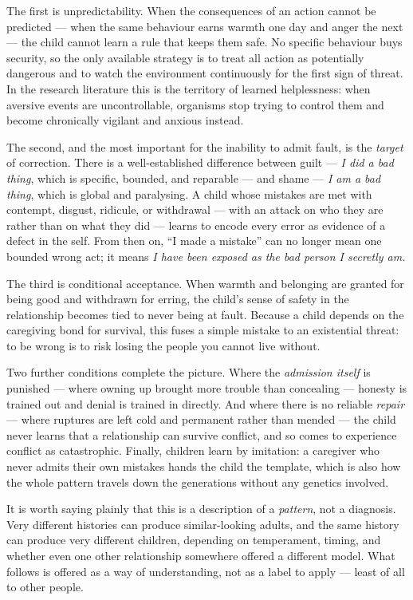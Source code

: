 \documentclass{article}
\begin{document}
The first is unpredictability. When the consequences of an action cannot be predicted --- when the same behaviour earns warmth one day and anger the next --- the child cannot learn a rule that keeps them safe. No specific behaviour buys security, so the only available strategy is to treat all action as potentially dangerous and to watch the environment continuously for the first sign of threat. In the research literature this is the territory of learned helplessness: when aversive events are uncontrollable, organisms stop trying to control them and become chronically vigilant and anxious instead.

The second, and the most important for the inability to admit fault, is the \textit{target} of correction. There is a well-established difference between guilt --- \textit{I did a bad thing}, which is specific, bounded, and reparable --- and shame --- \textit{I am a bad thing}, which is global and paralysing. A child whose mistakes are met with contempt, disgust, ridicule, or withdrawal --- with an attack on who they are rather than on what they did --- learns to encode every error as evidence of a defect in the self. From then on, \enquote{I made a mistake} can no longer mean one bounded wrong act; it means \textit{I have been exposed as the bad person I secretly am.}

The third is conditional acceptance. When warmth and belonging are granted for being good and withdrawn for erring, the child's sense of safety in the relationship becomes tied to never being at fault. Because a child depends on the caregiving bond for survival, this fuses a simple mistake to an existential threat: to be wrong is to risk losing the people you cannot live without.

Two further conditions complete the picture. Where the \textit{admission itself} is punished --- where owning up brought more trouble than concealing --- honesty is trained out and denial is trained in directly. And where there is no reliable \textit{repair} --- where ruptures are left cold and permanent rather than mended --- the child never learns that a relationship can survive conflict, and so comes to experience conflict as catastrophic. Finally, children learn by imitation: a caregiver who never admits their own mistakes hands the child the template, which is also how the whole pattern travels down the generations without any genetics involved.

It is worth saying plainly that this is a description of a \textit{pattern}, not a diagnosis. Very different histories can produce similar-looking adults, and the same history can produce very different children, depending on temperament, timing, and whether even one other relationship somewhere offered a different model. What follows is offered as a way of understanding, not as a label to apply --- least of all to other people.
\end{document}
